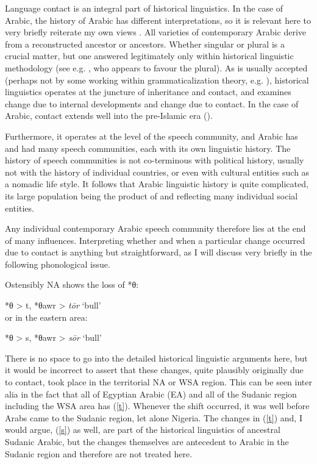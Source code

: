 \documentclass[output=paper]{langsci/langscibook}
\begin{document}
Language contact is an integral part of historical linguistics. In the case of Arabic, the history of Arabic has different interpretations, so it is relevant here to very briefly reiterate my own views \citep{Owens2006}. All varieties of contemporary Arabic derive from a reconstructed ancestor or ancestors. Whether singular or plural is a crucial matter, but one answered legitimately only within historical linguistic methodology (see e.g. \citealt{Retsö2013}, who appears to favour the plural). As is usually accepted (perhaps not by some working within grammaticalization theory, e.g. \citealt{HeineKuteva2011}), historical linguistics operates at the juncture of inheritance and contact, and examines change due to internal developments and change due to contact. In the case of Arabic, contact extends well into the pre-Islamic era (\citealt{Owens2013,Owens2016Aramaic,Owensforthcoming}).

Furthermore, it operates at the level of the speech community, and Arabic has and had many speech communities, each with its own linguistic history. The history of speech communities is not co-terminous with political history, usually not with the history of individual countries, or even with cultural entities such as a nomadic life style. It follows that Arabic linguistic history is quite complicated, its large population being the product of and reflecting many individual social entities. 

Any individual contemporary Arabic speech community therefore lies at the end of many influences. Interpreting whether and when a particular change occurred due to contact is anything but straightforward, as I will discuss very briefly in the following phonological issue.

Ostensibly NA shows the loss of *θ:

\ea\label{t}
*\textup{θ} > t, \textup{*}θawr > \textit{tōr}  \textup{‘bull’}\\
\z
  or in the eastern area:

\ea\label{s}
  *θ > s, \textup{*}θawr > \textit{sōr} \textup{‘bull’}\\
\z

There is no space to go into the detailed historical linguistic arguments here, but it would be incorrect to assert that these changes, quite plausibly originally due to contact, took place in the territorial NA or WSA region. This can be seen inter alia in the fact that all of Egyptian Arabic (EA) and all of the Sudanic region including the WSA area has (\ref{t}). Whenever the shift occurred, it was well before Arabs came to the Sudanic region, let alone Nigeria. The changes in (\ref{t}) and, I would argue, (\ref{s}) as well, are part of the historical linguistics of ancestral Sudanic Arabic, but the changes themselves are antecedent to Arabic in the Sudanic region and therefore are not treated here. 
\end{document}
